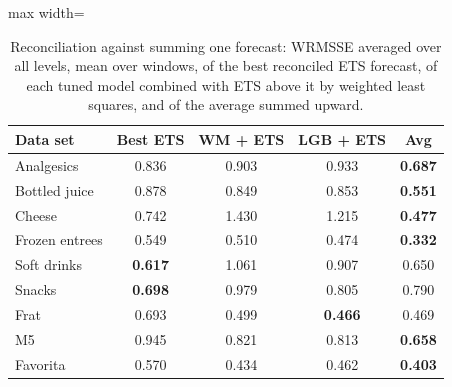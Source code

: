 \begin{table}[t]
\centering\footnotesize\setlength{\tabcolsep}{3pt}
\caption{Reconciliation against summing one forecast: WRMSSE averaged over all levels, mean over windows, of the best
reconciled ETS forecast, of each tuned model combined with ETS above it by weighted least squares, and of the average
summed upward.}
\label{tab:sup-reconcile}
\begin{adjustbox}{max width=\columnwidth}\begin{tabular}{lcccc}
\toprule
Data set & Best ETS & WM + ETS & LGB + ETS & Avg\\
\midrule
Analgesics & 0.836 & 0.903 & 0.933 & \cellcolor{avgcell}\textbf{0.687} \\
Bottled juice & 0.878 & 0.849 & 0.853 & \cellcolor{avgcell}\textbf{0.551} \\
Cheese & 0.742 & 1.430 & 1.215 & \cellcolor{avgcell}\textbf{0.477} \\
Frozen entrees & 0.549 & 0.510 & 0.474 & \cellcolor{avgcell}\textbf{0.332} \\
Soft drinks & \textbf{0.617} & 1.061 & 0.907 & 0.650 \\
Snacks & \textbf{0.698} & 0.979 & 0.805 & 0.790 \\
Frat & 0.693 & 0.499 & \textbf{0.466} & 0.469 \\
M5 & 0.945 & 0.821 & 0.813 & \cellcolor{avgcell}\textbf{0.658} \\
Favorita & 0.570 & 0.434 & 0.462 & \cellcolor{avgcell}\textbf{0.403} \\
\bottomrule
\end{tabular}\end{adjustbox}
\end{table}
